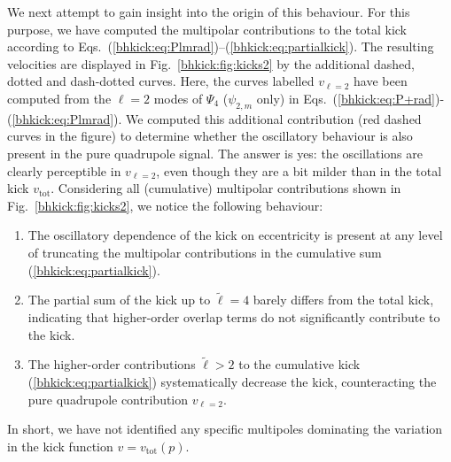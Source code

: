 We next attempt to gain insight into the origin of this
behaviour. For this purpose, we have computed the
multipolar contributions to the total kick according to
Eqs.~(\ref{bhkick:eq:Plmrad})--(\ref{bhkick:eq:partialkick}). The resulting
velocities are displayed in Fig.~\ref{bhkick:fig:kicks2} by the additional
dashed, dotted and dash-dotted curves.
Here, the curves labelled
$v_{\ell=2}$ have been computed from the $\ell=2$ modes of $\Psi_4$
($\psi_{2,m}$ only) in Eqs.~(\ref{bhkick:eq:P+rad})-(\ref{bhkick:eq:Plmrad}).
We computed this additional contribution (red dashed curves in the
figure) to determine whether the oscillatory behaviour is also present
in the pure quadrupole signal. The answer is yes: the oscillations are
clearly perceptible in $v_{\ell=2}$, even though they are a bit milder
than in the total kick $v_{\mathrm{tot}}$. Considering all
(cumulative) multipolar contributions shown in Fig.~\ref{bhkick:fig:kicks2},
we notice the following behaviour:
%
\begin{enumerate}
 \item The oscillatory dependence of the kick on eccentricity
       is present at any level of truncating the multipolar
       contributions in the cumulative sum (\ref{bhkick:eq:partialkick}).
 \item The partial sum of the kick up to $\tilde{\ell}=4$
       barely differs from the total kick, indicating that
       higher-order overlap terms do not significantly
       contribute to the kick.
 \item The higher-order contributions $\tilde{\ell}>2$
       to the cumulative kick (\ref{bhkick:eq:partialkick})
       systematically decrease the kick, counteracting
       the pure quadrupole contribution $v_{\ell=2}$.
\end{enumerate}
%
In short, we have not identified any specific multipoles
dominating the variation in the kick function $v=v_{\mathrm{tot}}(p)$.

